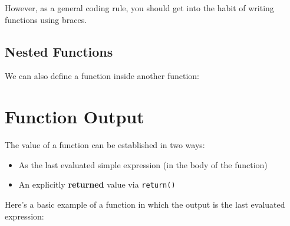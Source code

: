 \documentclass[
]{book}
\newenvironment{Shaded}{\begin{snugshade}}{\end{snugshade}}
\newcommand{\AttributeTok}[1]{\textcolor[rgb]{0.77,0.63,0.00}{#1}}
\newcommand{\CommentTok}[1]{\textcolor[rgb]{0.56,0.35,0.01}{\textit{#1}}}
\newcommand{\ControlFlowTok}[1]{\textcolor[rgb]{0.13,0.29,0.53}{\textbf{#1}}}
\newcommand{\DecValTok}[1]{\textcolor[rgb]{0.00,0.00,0.81}{#1}}
\newcommand{\ErrorTok}[1]{\textcolor[rgb]{0.64,0.00,0.00}{\textbf{#1}}}
\newcommand{\FunctionTok}[1]{\textcolor[rgb]{0.00,0.00,0.00}{#1}}
\newcommand{\NormalTok}[1]{#1}
\newcommand{\OtherTok}[1]{\textcolor[rgb]{0.56,0.35,0.01}{#1}}
\newcommand{\SpecialCharTok}[1]{\textcolor[rgb]{0.00,0.00,0.00}{#1}}
\providecommand{\tightlist}{%
  \setlength{\itemsep}{0pt}\setlength{\parskip}{0pt}}
\begin{document}
However, as a general coding rule, you should get into the habit of writing functions using braces.

\hypertarget{nested-functions}{%
\subsection{Nested Functions}\label{nested-functions}}

We can also define a function inside another function:

\begin{Shaded}
\end{Shaded}

\hypertarget{function-output}{%
\section{Function Output}\label{function-output}}

The value of a function can be established in two ways:

\begin{itemize}
\tightlist
\item
  As the last evaluated simple expression (in the body of the function)
\item
  An explicitly \textbf{returned} value via \texttt{return()}
\end{itemize}

Here's a basic example of a function in which the output is the last evaluated
expression:
\end{document}
